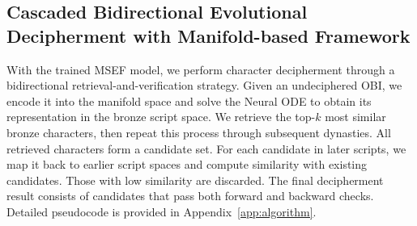 \documentclass{article}
\begin{document}


\subsection{Cascaded Bidirectional Evolutional Decipherment with Manifold-based Framework}
\label{sec:decipherment_algo}

With the trained MSEF model, we perform character decipherment through a bidirectional retrieval-and-verification strategy. 
Given an undeciphered OBI, we encode it into the manifold space and solve the Neural ODE to obtain its representation in the bronze script space. We retrieve the top-$k$ most similar bronze characters, then repeat this process through subsequent dynasties. All retrieved characters form a candidate set. For each candidate in later scripts, we map it back to earlier script spaces and compute similarity with existing candidates. Those with low similarity are discarded. The final decipherment result consists of candidates that pass both forward and backward checks. Detailed pseudocode is provided in Appendix~\ref{app:algorithm}.
\end{document}
